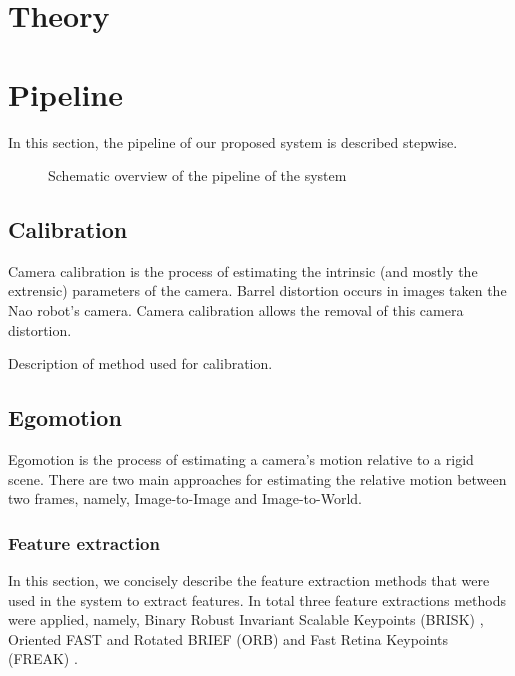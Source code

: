 \documentclass[a4paper]{article}
\begin{document}
\section{Theory}

\section{Pipeline}
In this section, the pipeline of our proposed system is described stepwise.

\begin{figure}[!hb]
\centerline{
}
\caption{Schematic overview of the pipeline of the system}
\label{fig:system}
\end{figure}

\subsection{Calibration}
Camera calibration is the process of estimating the intrinsic (and mostly the extrensic) parameters of the camera. Barrel distortion occurs in images taken the Nao robot's camera. Camera calibration allows the removal of this camera distortion.
\par
Description of method used for calibration.


\subsection{Egomotion}
Egomotion is the process of estimating a camera's motion relative to a rigid scene. There are two main approaches for estimating the relative motion between two frames, namely, Image-to-Image and Image-to-World.


\subsubsection{Feature extraction}
In this section, we concisely describe the feature extraction methods that were used in the system to extract features. In total three feature extractions methods were applied, namely, Binary Robust Invariant Scalable Keypoints (BRISK) \cite{Leutenegger2011}, Oriented FAST and Rotated BRIEF (ORB) \cite{Rublee2011} and Fast Retina Keypoints (FREAK) \cite{Ortiz2012}.
\end{document}
